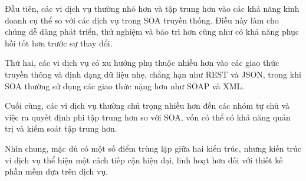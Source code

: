 Đầu tiên, các vi dịch vụ thường nhỏ hơn và tập trung hơn vào các khả năng kinh doanh cụ thể so với các dịch vụ trong SOA truyền thống. Điều này làm cho chúng dễ dàng phát triển, thử nghiệm và bảo trì hơn cũng như có khả năng phục hồi tốt hơn trước sự thay đổi.

Thứ hai, các vi dịch vụ có xu hướng phụ thuộc nhiều hơn vào các giao thức truyền thông và định dạng dữ liệu nhẹ, chẳng hạn như REST và JSON, trong khi SOA thường sử dụng các giao thức nặng hơn như SOAP và XML.

Cuối cùng, các vi dịch vụ thường chú trọng nhiều hơn đến các nhóm tự chủ và việc ra quyết định phi tập trung hơn so với SOA, vốn có thể có khả năng quản trị và kiểm soát tập trung hơn.

Nhìn chung, mặc dù có một số điểm trùng lặp giữa hai kiến trúc, nhưng kiến trúc vi dịch vụ thể hiện một cách tiếp cận hiện đại, linh hoạt hơn đối với thiết kế phần mềm dựa trên dịch vụ.


